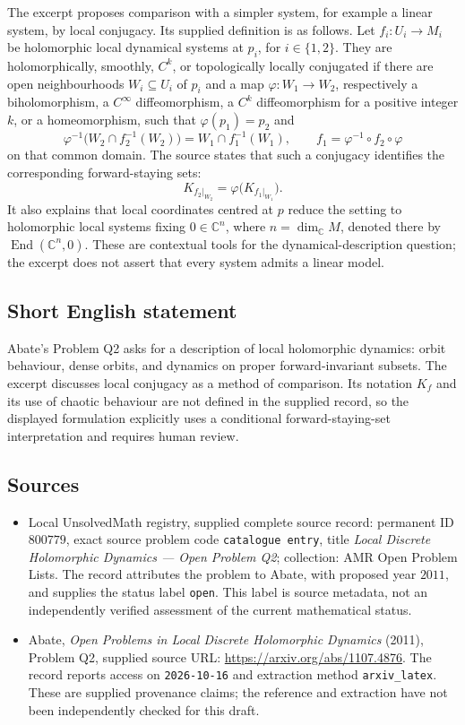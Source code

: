 \documentclass[11pt]{article}
\newcommand{\C}{\mathbb{C}}
\begin{document}
The excerpt proposes comparison with a simpler system, for example a linear system, by local conjugacy. Its supplied definition is as follows. Let \(f_i\colon U_i\to M_i\) be holomorphic local dynamical systems at \(p_i\), for \(i\in\{1,2\}\). They are holomorphically, smoothly, \(C^k\), or topologically locally conjugated if there are open neighbourhoods \(W_i\subseteq U_i\) of \(p_i\) and a map \(\varphi\colon W_1\to W_2\), respectively a biholomorphism, a \(C^\infty\) diffeomorphism, a \(C^k\) diffeomorphism for a positive integer \(k\), or a homeomorphism, such that \(\varphi(p_1)=p_2\) and
\[
\varphi^{-1}\bigl(W_2\cap f_2^{-1}(W_2)\bigr)
 =W_1\cap f_1^{-1}(W_1),
\qquad
f_1=\varphi^{-1}\circ f_2\circ\varphi
\]
on that common domain. The source states that such a conjugacy identifies the corresponding forward-staying sets:
\[
K_{f_2|_{W_2}}=\varphi\bigl(K_{f_1|_{W_1}}\bigr).
\]
It also explains that local coordinates centred at \(p\) reduce the setting to holomorphic local systems fixing \(0\in\C^n\), where \(n=\dim_{\C}M\), denoted there by \(\operatorname{End}(\C^n,0)\). These are contextual tools for the dynamical-description question; the excerpt does not assert that every system admits a linear model.
\subsection{Short English statement}
Abate's Problem Q2 asks for a description of local holomorphic dynamics: orbit behaviour, dense orbits, and dynamics on proper forward-invariant subsets. The excerpt discusses local conjugacy as a method of comparison. Its notation \(K_f\) and its use of chaotic behaviour are not defined in the supplied record, so the displayed formulation explicitly uses a conditional forward-staying-set interpretation and requires human review.
\subsection{Sources}
\begin{itemize}
\item Local UnsolvedMath registry, supplied complete source record: permanent ID \(800779\), exact source problem code \texttt{catalogue entry}, title \emph{Local Discrete Holomorphic Dynamics --- Open Problem Q2}; collection: AMR Open Problem Lists. The record attributes the problem to Abate, with proposed year \(2011\), and supplies the status label \texttt{open}. This label is source metadata, not an independently verified assessment of the current mathematical status.
\item Abate, \emph{Open Problems in Local Discrete Holomorphic Dynamics} (2011), Problem Q2, supplied source URL: \url{https://arxiv.org/abs/1107.4876}. The record reports access on \texttt{2026-10-16} and extraction method \texttt{arxiv\_latex}. These are supplied provenance claims; the reference and extraction have not been independently checked for this draft.
\end{itemize}
\end{document}
